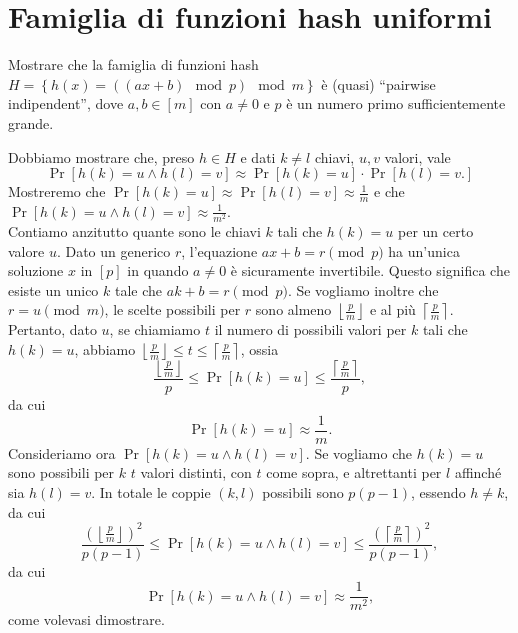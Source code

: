 \chapter{Famiglia di funzioni hash uniformi}

\begin{problem*}
    Mostrare che la famiglia di funzioni hash 
    \(H = \left\{h(x) = ((ax + b ) \mod p) \mod m\right\}\) \`e (quasi) ``pairwise 
    indipendent'', dove \(a,b\in [m]\) con \(a\neq 0\) e \(p\) \`e un numero primo 
    sufficientemente grande.
\end{problem*}
Dobbiamo mostrare che, preso $h\in H$ e dati $k\neq l$ chiavi, $u, v$ valori, vale \[\Pr[h(k)=u \wedge h(l)=v]\approx\Pr[h(k)=u]\cdot\Pr[h(l)=v.]\] Mostreremo che $\Pr[h(k)=u]\approx\Pr[h(l)=v]\approx\frac{1}{m}$ e che $\Pr[h(k)=u \wedge h(l)=v]\approx\frac{1}{m^2}$.
\[\]
Contiamo anzitutto quante sono le chiavi $k$ tali che $h(k)=u$ per un certo valore $u$.\newline
Dato un generico $r$, l'equazione $ax+b=r \pmod p$ ha un'unica soluzione $x$ in $[p]$ in quando $a\neq0$ è sicuramente invertibile. Questo significa che esiste un unico $k$ tale che $ak+b=r \pmod p$.\newline
Se vogliamo inoltre che $r = u \pmod m$, le scelte possibili per $r$ sono almeno $\left\lfloor\frac{p}{m}\right\rfloor$ e al più $\left\lceil \frac{p}{m}\right\rceil$.\newline
Pertanto, dato $u$, se chiamiamo $t$ il numero di possibili valori per $k$ tali che $h(k)=u$, abbiamo $\left\lfloor\frac{p}{m}\right\rfloor\le t \le \left\lceil \frac{p}{m}\right\rceil$, ossia \[\frac{\left\lfloor\frac{p}{m}\right\rfloor}{p}\le\Pr[h(k)=u]\le\frac{\left\lceil \frac{p}{m}\right\rceil}{p},\] da cui \[\Pr[h(k)=u]\approx\frac{1}{m}.\]
\[\]
Consideriamo ora $\Pr[h(k)=u \wedge h(l)=v]$. Se vogliamo che $h(k)=u$ sono possibili per $k$ $t$ valori distinti, con $t$ come sopra, e altrettanti per $l$ affinché sia $h(l)=v$. In totale le coppie $(k, l)$ possibili sono $p(p-1)$, essendo $h\neq k$, da cui \[\frac{\left(\left\lfloor\frac{p}{m}\right\rfloor\right)^2}{p(p-1)}\le \Pr[h(k)=u \wedge h(l)=v]\le\frac{\left(\left\lceil \frac{p}{m}\right\rceil\right)^2}{p(p-1)},\] da cui \[\Pr[h(k)=u \wedge h(l)=v]\approx\frac{1}{m^2},\] come volevasi dimostrare.

